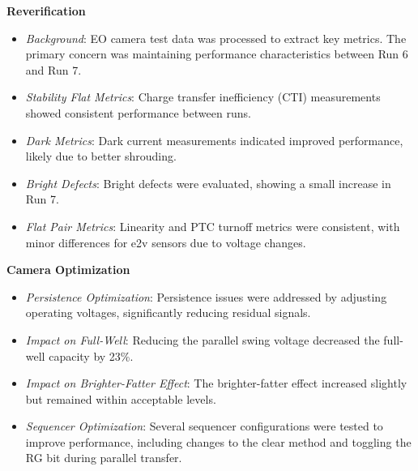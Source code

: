 \textbf{Reverification} \\
\begin{itemize}
    \item \textit{Background}: EO camera test data was processed to extract key metrics. The primary concern was maintaining performance characteristics between Run 6 and Run 7.
    \item \textit{Stability Flat Metrics}: Charge transfer inefficiency (CTI) measurements showed consistent performance between runs.
    \item \textit{Dark Metrics}: Dark current measurements indicated improved performance, likely due to better shrouding.
    \item \textit{Bright Defects}: Bright defects were evaluated, showing a small increase in Run 7.
    \item \textit{Flat Pair Metrics}: Linearity and PTC turnoff metrics were consistent, with minor differences for e2v sensors due to voltage changes.
\end{itemize}

\textbf{Camera Optimization} \\
\begin{itemize}
    \item \textit{Persistence Optimization}: Persistence issues were addressed by adjusting operating voltages, significantly reducing residual signals.
    \item \textit{Impact on Full-Well}: Reducing the parallel swing voltage decreased the full-well capacity by 23\%.
    \item \textit{Impact on Brighter-Fatter Effect}: The brighter-fatter effect increased slightly but remained within acceptable levels.
    \item \textit{Sequencer Optimization}: Several sequencer configurations were tested to improve performance, including changes to the clear method and toggling the RG bit during parallel transfer.
\end{itemize}

